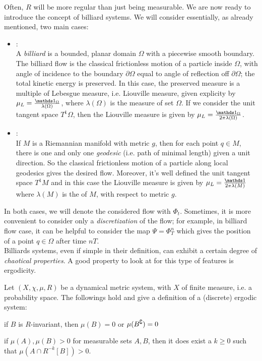 Often, $R$ will be more regular than just being measurable. We are now ready to introduce the concept of billiard systems. We will consider essentially, as already mentioned, two main cases:
\begin{itemize}
\item {}:\\
A \emph{billiard} is a bounded, planar domain $\Omega$ with a piecewise smooth boundary. The billiard flow is the classical frictionless motion of a particle inside $\Omega$, with angle of incidence to the boundary $\partial\Omega$ equal to angle of reflection off $\partial\Omega$; the total kinetic energy is preserved. In this case, the preserved measure is a multiple of Lebesgue measure, i.e. Liouville measure, given explicity by $\mu_{L}=\frac{\one_{\Omega}}{\lambda(\Omega)}$, where $\lambda(\Omega)$ is the measure of set $\Omega$. If we consider the unit tangent space $T^{1}\Omega$, then the Liouville measure is given by $\mu_{L}=\frac{\one_{\Omega}}{2\pi\lambda(\Omega)}$. 
\item {}:\\
If $M$ is a Riemannian manifold with metric $g$, then for each point $q\in M$, there is one and only one \emph{geodesic} (i.e. path of minimal length) given a unit direction. So the classical frictionless motion of a particle along local geodesics gives the desired flow. Moreover, it's well defined the unit tangent space $T^{1}M$ and in this case the Liouville measure is given by $\mu_{L}=\frac{\one}{2\pi\lambda(M)}$ where $\lambda(M)$ is the  of $M$, with respect to metric $g$. 
\end{itemize}
In both cases, we will denote the considered flow with $\Phi_{t}$. Sometimes, it is more convenient to consider only a \emph{discretization} of the flow; for example, in billiard flow case, it can be helpful to consider the map $\Psi=\Phi_{T}^{n}$ which gives the position of a point $q\in\Omega$ after time $nT$.\\
Billiards systems, even if simple in their definition, can exhibit a certain degree of \emph{chaotical properties}. A good property to look at for this type of features is ergodicity.

\begin{nteo}
\label{definteo:ergodic_discrete}
Let $(X,\chi,\mu,R)$ be a dynamical metric system, with $X$ of finite measure, i.e. a probability space. The followings hold and give a definition of a (discrete) ergodic system:
\begin{compactitem}
\item if $B$ is $R$-invariant, then $\mu(B)=0$ or $\mu(B^{\complement})=0$
\item if $\mu(A),\mu(B)>0$ for measurable sets $A,B$, then it does exist a $k\geq0$ such that $\mu(A\cap R^{-k}[B])>0$.
\end{compactitem}
\end{nteo}

